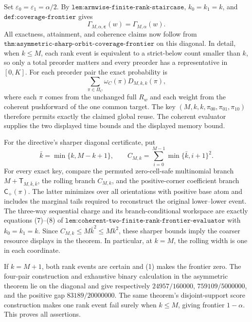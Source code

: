 Set \(\varepsilon_0=\varepsilon_1=\alpha/2\). By \(\texttt{lem:armwise-finite-rank-staircase}\), \(k_0=k_1=k\), and \(\texttt{def:coverage-frontier}\) gives
\[
\Gamma_{M,\alpha,\boldsymbol\varepsilon}(w)=\Gamma_{M,\alpha}(w).
\tag{1}
\]
All exactness, attainment, and coherence claims now follow from \(\texttt{thm:asymmetric-sharp-orbit-coverage-frontier}\) on this diagonal. In detail, when \(k\le M\), each rank event is equivalent to a strict-below count smaller than \(k\), so only a total preorder matters and every preorder has a representative in \([0,K]\). For each preorder pair the exact probability is
\[
\sum_{\pi\in\Pi_C}\omega_C(\pi)D_{M,k,k}(\pi),
\]
where each \(\pi\) comes from the unchanged full \(R_w\) and each weight from the coherent pushforward of the one common target. The key \((M,k,k,\pi_{00},\pi_{01},\pi_{10})\) therefore permits exactly the claimed global reuse. The coherent evaluator supplies the two displayed time bounds and the displayed memory bound.

For the directive's sharper diagonal certificate, put
\[
\bar k=\min\{k,M-k+1\},\qquad C_{M,k}=\sum_{i=0}^{M-1}\min\{\bar k,i+1\}^2.
\]
For every exact key, compare the permuted zero-cell-safe multinomial branch \(M+\mathsf T_{M,\bar k,\bar k}\), the rolling branch \(C_{M,k}\), and the positive-corner coefficient branch \(\mathsf C_+(\pi)\). The latter minimizes over all orientations with positive base atom and includes the marginal tails required to reconstruct the original lower--lower event. The three-way sequential charge and its branch-conditional workspace are exactly equations (7)--(8) of \(\texttt{lem:coherent-two-finite-rank-frontier-evaluator}\) with \(k_0=k_1=k\). Since \(C_{M,k}\le M\bar k^2\le Mk^2\), these sharper bounds imply the coarser resource displays in the theorem. In particular, at \(k=M\), the rolling width is one in each coordinate.

If \(k=M+1\), both rank events are certain and (1) makes the frontier zero. The four-pair construction and exhaustive binary calculation in the asymmetric theorem lie on the diagonal and give respectively \(24957/160000\), \(759109/5000000\), and the positive gap \(83189/20000000\). The same theorem's disjoint-support score construction makes one rank event fail surely when \(k\le M\), giving frontier \(1-\alpha\). This proves all assertions.